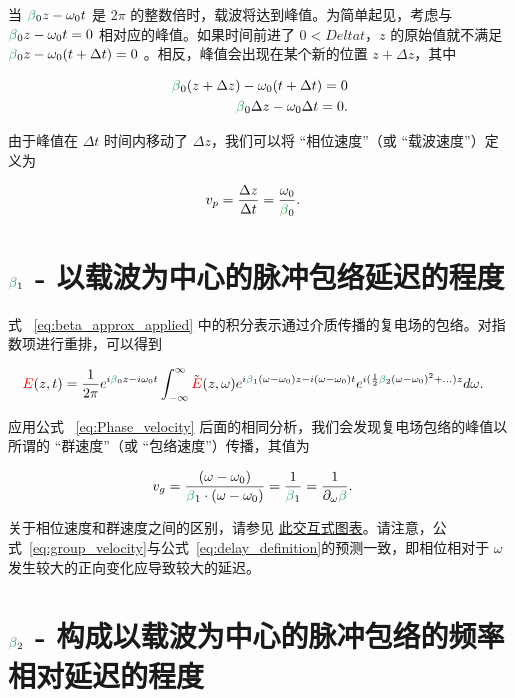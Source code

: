当 $\betag_0z-\omega_0t$ 是 $2\pi$ 的整数倍时，载波将达到峰值。为简单起见，考虑与 $\betag_0z-\omega_0t=0$ 相对应的峰值。如果时间前进了 $0<Delta t$，$z$ 的原始值就不满足 $\betag_0z-\omega_0(t+\Delta t)=0$ 。相反，峰值会出现在某个新的位置 $z+\Delta z$，其中

\begin{align}
    \betag_0(z+\Delta z)-\omega_0(t+\Delta t)=0\\ \nonumber
    \betag_0\Delta z-\omega_0\Delta t=0.
\end{align}

由于峰值在 $\Delta t$ 时间内移动了 $\Delta z$，我们可以将 “相位速度”（或 “载波速度”）定义为

\begin{align}
\label{eq:Phase_velocity}
    v_p &= \frac{\Delta z}{\Delta t} = \frac{\omega_0}{\betag_0}.
\end{align}


\section{$\betag_1$ - 以载波为中心的脉冲包络延迟的程度}

式 ~\ref{eq:beta_approx_applied} 中的积分表示通过介质传播的复电场的包络。对指数项进行重排，可以得到

\begin{align}
\label{eq:envelope_beta1}
    \E(z,t) &= \frac{1}{2\pi} e^{i\betag_0z-i\omega_0t}  \int_{-\infty}^{\infty} \Tilde{\E}(z,\omega) e^{i\betag_1(\omega-\omega_0)z-i(\omega-\omega_0) t} e^{i(\frac{1}{2}\betag_2(\omega-\omega_0)^2+...)z} d\omega.
\end{align}

应用公式 ~\ref{eq:Phase_velocity} 后面的相同分析，我们会发现复电场包络的峰值以所谓的 “群速度”（或 “包络速度”）传播，其值为

\begin{align}
\label{eq:group_velocity}
    v_g &= \frac{(\omega-\omega_0)}{\betag_1\cdot(\omega-\omega_0)} = \frac{1}{\betag_1} = \frac{1}{\partial_\omega\betag}.
\end{align}

关于相位速度和群速度之间的区别，请参见 \href{https://www.desmos.com/calculator/rq2physwac}{此交互式图表}。请注意，公式~\ref{eq:group_velocity}与公式~\ref{eq:delay_definition}的预测一致，即相位相对于 $\omega$ 发生较大的正向变化应导致较大的延迟。




\section{$\betag_2$ - 构成以载波为中心的脉冲包络的频率相对延迟的程度}

